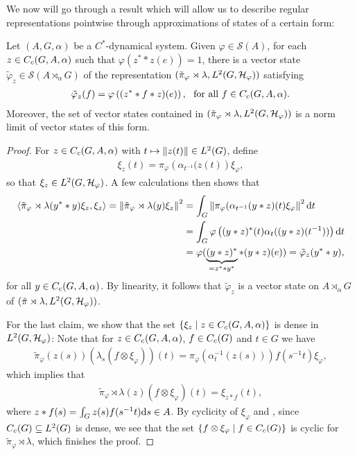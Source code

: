 We now will go through a result which will allow us to describe regular representations pointwise through approximations of states of a certain form:
\begin{proposition}
	Let $(A,G,\alpha)$ be a $C^*$-dynamical system. Given $\varphi \in \mathcal{S}(A)$, for each $z \in C_c(G,A,\alpha)$ such that $\varphi(z^* \ast z(e)) = 1$, there is a vector state $\tilde \varphi_z \in \mathcal{S}(A \rtimes_\alpha G)$ of the representation $(\tilde \pi_{\varphi} \rtimes \lambda , L^2(G,\mathcal{H}_\varphi))$ satisfying
	\begin{align*}
		\tilde \varphi_z (f) =\varphi\left( (z^* \ast f \ast z)(e) \right), \ \text{ for all } f \in C_c(G,A,\alpha).
	\end{align*}
	Moreover, the set of vector states contained in $(\tilde \pi_{\varphi} \rtimes \lambda , L^2(G,\mathcal{H}_\varphi))$ is a norm limit of vector states of this form.
	\label{mult:vectorstateapprox}
\end{proposition}
\begin{proof}
	For $z \in C_c(G,A,\alpha)$ with $t \mapsto \left\lVert z(t) \right\rVert \in L^2(G)$, define
	\begin{align*}
		\xi_z(t) = \pi_{\varphi}\left( \alpha_{t^{-1}}(z(t) \right)\xi_\varphi,
	\end{align*}
	so that $\xi_z \in L^2(G,\mathcal{H}_\varphi)$. A few calculations then shows that 
	\begin{align*}
		\langle \tilde \pi_\varphi \rtimes \lambda (y^* \ast y) \xi_z , \xi_z \rangle  = \left\lVert \tilde \pi_\varphi \rtimes \lambda(y) \xi_z \right\rVert ^2 &= \int_G \left\lVert  \pi_\varphi ( \alpha_{t^{-1}}(y \ast z)(t) \xi_\varphi \right\rVert^2 \mathrm{d} t \\
		&=\int_G \varphi\left( (y \ast z)^*(t) \alpha_t( (y \ast z)( t^{-1}) ) \right) \mathrm{d} t \\
		&= \varphi ( \underbrace{(y  \ast z )^*}_{= z^* \ast y^*} \ast (y \ast z) (e)) = \tilde\varphi_{z} (y^* \ast y),
	\end{align*}
	for all $y \in C_c(G,A,\alpha)$. By linearity, it follows that $\tilde \varphi_z$ is a vector state on $A \rtimes_\alpha G$ of $(\tilde \pi \rtimes \lambda, L^2(G,\mathcal{H}_\varphi))$.
	
	For the last claim, we show that the set $\{ \xi_z \mid z \in C_c(G,A,\alpha)\}$ is dense in $L^2(G,\mathcal{H}_\varphi)$: Note that for $z \in C_c(G,A,\alpha)$, $f \in C_c(G)$ and $t \in G$ we have
	\begin{align*}
		\tilde \pi_\varphi(z(s)) (\lambda_s (f \otimes \xi_\varphi))(t) = \pi_\varphi(\alpha_t^{-1}(z(s)))f(s^{-1}t) \xi_\varphi,
	\end{align*}
	which implies that 
	\begin{align*}
		\tilde \pi_\varphi \rtimes \lambda (z) (f \otimes \xi_\varphi) (t) = \xi_{z \ast f}(t),
	\end{align*}
	where $z \ast f(s) = \int_G z(s) f(s^{-1}t) \mathrm{d} s \in A$.  By cyclicity of $\xi_\varphi$ and , since $C_c(G) \subseteq L^2(G)$ is dense, we see that the set $\{ f \otimes \xi_\varphi \mid f \in C_c(G)\}$ is cyclic for $\tilde \pi_\varphi \rtimes \lambda$, which finishes the proof.
\end{proof}


